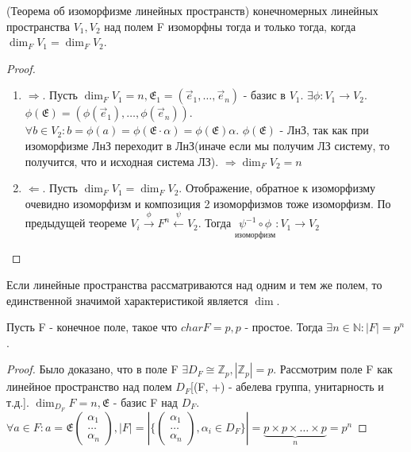 \begin{corollary}
	(Теорема об изоморфизме линейных пространств)  конечномерных линейных пространства \(V_1, V_2\) над полем F изоморфны тогда и только тогда, когда \(\dim_F V_1 = \dim_F V_2\).
\end{corollary}
\begin{proof}
	\begin{enumerate}
		\item \(\Longrightarrow\). Пусть \(\dim_F V_1 = n, \mathfrak{E}_1 = (\vec e_1, \ldots, \vec e_n)\) - базис в \(V_1\). $\exists\phi:V_1\to V_2$. $\phi(\mathfrak{E}) = (\phi(\vec e_1),\ldots, \phi(\vec e_n))$. \(\forall b\in V_2: b = \phi(a) = \phi(\mathfrak{E}\cdot \alpha) = \phi(\mathfrak{E})\alpha\). \(\phi(\mathfrak{E})\) - ЛнЗ, так как при изоморфизме ЛнЗ переходит в ЛнЗ(иначе если мы получим ЛЗ систему, то получится, что и исходная система ЛЗ). $\Longrightarrow \dim_FV_2 = n$
		\item $\Longleftarrow$. Пусть \(\dim_FV_1 = \dim_FV_2\). Отображение, обратное к изоморфизму очевидно изоморфизм и композиция 2 изоморфизмов тоже изоморфизм. По предыдущей теореме \(V_i\overset{\phi}{\longrightarrow}F^n\overset{\psi}{\longleftarrow}V_2\). Тогда \(\underset{\text{изоморфизм}}{\psi^{-1}\circ \phi}: V_1\to V_2\)
	\end{enumerate}
\end{proof}
\begin{corollary}
	Если линейные пространства рассматриваются над одним и тем же полем, то единственной значимой характеристикой является \(\dim\).
\end{corollary}
\begin{theorem}
	Пусть F - конечное поле, такое что \(char F = p, p\) - простое. Тогда \(\exists n\in\mathbb{N}: |F| = p^n\).
\end{theorem}
\begin{proof}
	Было доказано, что в поле F \(\exists D_F\cong \mathbb{Z}_p, |\mathbb{Z}_p| = p\). Рассмотрим поле F как линейное пространство над полем \(D_F\)[(F, +) - абелева группа, унитарность и т.д.]. \(\dim_{D_F}F = n, \mathfrak{E}\) - базис F над \(D_F\). \(\forall a\in F: a = \mathfrak{E}\begin{pmatrix}
	\alpha_1 \\ \ldots \\ \alpha_n
	\end{pmatrix}, |F| = \left|\{\begin{pmatrix}
		\alpha_1 \\ \ldots \\ \alpha_n
	\end{pmatrix}, \alpha_i\in D_F\}\right| = \underbrace{p\times p\times\ldots\times p}_n = p^n\)
\end{proof}
